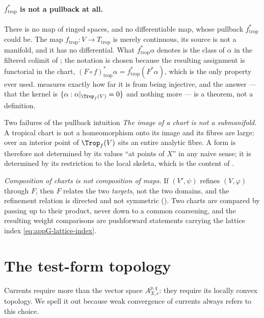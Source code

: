 \paragraph{$f_{\mathrm{trop}}^*$ is not a pullback at all.}
There is no map of ringed spaces, and no differentiable map, whose pullback
$f_{\mathrm{trop}}^*$ could be.  The map $f_{\mathrm{trop}}:V\to
T_{\mathrm{trop}}$ is merely continuous, its source is not a manifold, and it
has no differential.  What $f_{\mathrm{trop}}^*\alpha$ denotes is the class
of $\alpha$ in the filtered colimit of ; the notation
is chosen because the resulting assignment is functorial in the chart,
$(F\circ f)_{\mathrm{trop}}^*\alpha=f_{\mathrm{trop}}^*(F^*\alpha)$, which is
the only property ever used.   measures exactly how
far it is from being injective, and the answer --- that the kernel is
$\{\alpha:\alpha|_{\Trop_f(V)}=0\}$ and nothing more --- is a theorem, not a
definition.

\begin{warning}{Two failures of the pullback intuition}
\emph{The image of a chart is not a submanifold.}  A tropical chart is not a
homeomorphism onto its image and its fibres are large: over an interior point
of $\Trop_f(V)$ sits an entire analytic fibre.  A form is therefore not
determined by its values ``at points of $X$'' in any naive sense; it is
determined by its restriction to the local skeleta, which is the content of
.

\emph{Composition of charts is not composition of maps.}  If $(V',\psi)$
refines $(V,\varphi)$ through $F$, then $F$ relates the two \emph{targets},
not the two domains, and the refinement relation is directed and not
symmetric ().  Two charts are compared by
passing up to their product, never down to a common coarsening, and the
resulting weight comparisons are pushforward statements carrying the lattice
index \eqref{eq:appG-lattice-index}.
\end{warning}

\section{The test-form topology}
\label{sec:ch13-topology}

Currents require more than the vector space $A_{X,c}^{p,q}$: they require its
locally convex topology.  We spell it out because weak convergence of
currents always refers to this choice.

